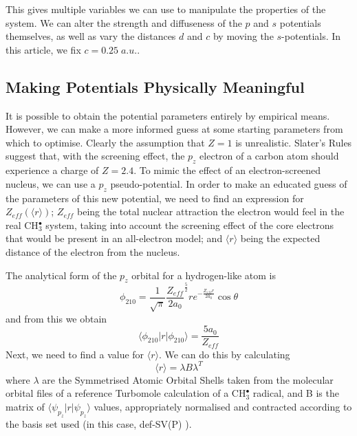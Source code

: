 \documentclass[journal=jctcce,manuscript=article]{achemso}
\begin{document}
This gives multiple variables we can use to manipulate the properties of the system.
We can alter the strength and diffuseness of the \(p\) and \(s\) potentials themselves,
as well as vary the distances \(d\) and \(c\) by moving the \(s\)-potentials.
In this article, we fix \(c = 0.25\;a.u.\).

\subsection{Making Potentials Physically Meaningful}
\label{section:potential_derivation}

It is possible to obtain the potential parameters entirely by empirical means. However, we can make a more informed guess at some starting parameters from which to optimise. Clearly the assumption that \(Z = 1\) is unrealistic. Slater's Rules\cite{slatersrules} suggest that, with the screening effect, the \(p_{z}\) electron of a carbon atom should experience a charge of \(Z = 2.4\). To mimic the effect of an electron-screened nucleus, we can use a \(p_{z}\) pseudo-potential. In order to make an educated guess of the parameters of this new potential, we need to find an expression for \(Z_{eff}(\langle r \rangle)\); \(Z_{eff}\) being the total nuclear attraction the electron would feel in the real CH\(^{\bullet}_{3}\) system, taking into account the screening effect of the core electrons that would be present in an all-electron model; and \( \langle r \rangle \) being the expected distance of the electron from the nucleus.

The analytical form of the \(p_{z}\) orbital for a hydrogen-like atom is\cite{nyu_h_solutions}
\begin{equation}
\phi_{210} = \frac{1}{\sqrt{\pi}} \frac{Z_{eff}}{2a_{0}} ^{\frac{5}{2}} re^{-\frac{Z_{eff}r}{2a_{0}}} \cos \theta
\end{equation}
and from this we obtain 
\begin{equation}
\label{equation:PsirPsi}
\langle \phi_{210} | r | \phi_{210} \rangle = \frac{5a_{0}}{Z_{eff}}
\end{equation}
Next, we need to find a value for \( \langle r \rangle \). We can do this by calculating
\begin{equation}
\langle r \rangle = \lambda B \lambda^{T}
\label{equation:exp_r}
\end{equation}
where \(\lambda\) are the Symmetrised Atomic Orbital Shells taken from the molecular orbital files of a reference Turbomole calculation of a CH\(^{\bullet}_{3}\) radical, and B is the matrix of \(\langle \psi_{p_{z}} | r | \psi_{p_{z}} \rangle\) values, appropriately normalised and contracted according to the basis set used (in this case, def-SV(P) \cite{defsvp}).
\end{document}
